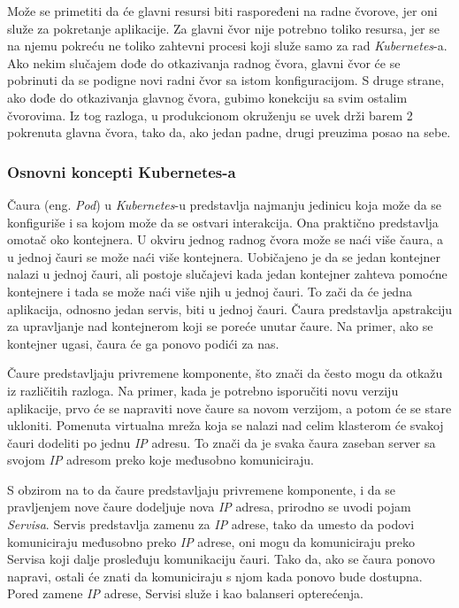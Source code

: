 Može se primetiti da će glavni resursi biti raspoređeni na radne čvorove, jer oni služe za pokretanje 
aplikacije. Za glavni čvor nije potrebno toliko resursa, jer se na njemu pokreću ne toliko zahtevni procesi 
koji služe samo za rad \textit{Kubernetes}-a. Ako nekim slučajem dođe do otkazivanja radnog čvora, glavni čvor 
će se pobrinuti da se podigne novi radni čvor sa istom konfiguracijom. S druge strane, ako dođe do 
otkazivanja glavnog čvora, gubimo konekciju sa svim ostalim čvorovima. Iz tog razloga, u produkcionom 
okruženju se uvek drži barem 2 pokrenuta glavna čvora, tako da, ako jedan padne, drugi preuzima 
posao na sebe.

\subsubsection{Osnovni koncepti Kubernetes-a}
Čaura (eng. {\em Pod}) u \textit{Kubernetes}-u predstavlja najmanju jedinicu koja može da se konfiguriše i sa kojom može da 
se ostvari interakcija. Ona praktično predstavlja omotač oko kontejnera. U okviru jednog radnog čvora 
može se naći više čaura, a u jednoj čauri se može naći više kontejnera. Uobičajeno je da se jedan 
kontejner nalazi u jednoj čauri, ali postoje slučajevi kada jedan kontejner zahteva pomoćne kontejnere 
i tada se može naći više njih u jednoj čauri. To zači da će jedna aplikacija, odnosno jedan servis, 
biti u jednoj čauri. Čaura predstavlja apstrakciju za upravljanje nad kontejnerom koji se poreće unutar
čaure. Na primer, ako se kontejner ugasi, čaura će ga ponovo podići za nas. 

Čaure predstavljaju privremene komponente, što znači da često mogu da otkažu iz različitih razloga. 
Na primer, kada je potrebno isporučiti novu verziju aplikacije, prvo će se napraviti nove čaure sa 
novom verzijom, a potom će se stare ukloniti. Pomenuta virtualna mreža koja se nalazi nad celim 
klasterom će svakoj čauri dodeliti po jednu \textit{IP} adresu. To znači da je svaka čaura zaseban server sa 
svojom \textit{IP} adresom preko koje međusobno komuniciraju.

S obzirom na to da čaure predstavljaju privremene komponente, i da se pravljenjem nove čaure dodeljuje 
nova \textit{IP} adresa, prirodno se uvodi pojam {\em Servisa}. Servis predstavlja zamenu za \textit{IP} adrese, tako 
da umesto da podovi komuniciraju međusobno preko \textit{IP} adrese, oni mogu da komuniciraju preko Servisa 
koji dalje prosleđuju komunikaciju čauri. Tako da, ako se čaura ponovo napravi, ostali će znati da komuniciraju 
s njom kada ponovo bude dostupna. Pored zamene \textit{IP} adrese, Servisi služe i kao balanseri opterećenja. 

